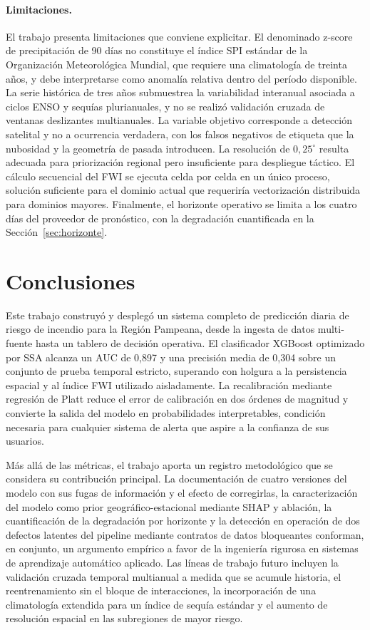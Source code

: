 \documentclass[11pt,a4paper]{article}
\begin{document}
\paragraph{Limitaciones.}
El trabajo presenta limitaciones que conviene explicitar. El denominado
z-score de precipitación de 90 días no constituye el índice SPI estándar de
la Organización Meteorológica Mundial, que requiere una climatología de
treinta años, y debe interpretarse como anomalía relativa dentro del
período disponible. La serie histórica de tres años submuestrea la
variabilidad interanual asociada a ciclos ENSO y sequías plurianuales, y no
se realizó validación cruzada de ventanas deslizantes multianuales. La
variable objetivo corresponde a detección satelital y no a ocurrencia
verdadera, con los falsos negativos de etiqueta que la nubosidad y la
geometría de pasada introducen. La resolución de $0{,}25^{\circ}$ resulta
adecuada para priorización regional pero insuficiente para despliegue
táctico. El cálculo secuencial del FWI se ejecuta celda por celda en un
único proceso, solución suficiente para el dominio actual que requeriría
vectorización distribuida para dominios mayores. Finalmente, el horizonte
operativo se limita a los cuatro días del proveedor de pronóstico, con la
degradación cuantificada en la Sección~\ref{sec:horizonte}.

\section{Conclusiones}
\label{sec:conclusiones}

Este trabajo construyó y desplegó un sistema completo de predicción diaria
de riesgo de incendio para la Región Pampeana, desde la ingesta de datos
multi-fuente hasta un tablero de decisión operativa. El clasificador
XGBoost optimizado por SSA alcanza un AUC de 0,897 y una precisión media de
0,304 sobre un conjunto de prueba temporal estricto, superando con holgura
a la persistencia espacial y al índice FWI utilizado aisladamente. La
recalibración mediante regresión de Platt reduce el error de calibración en
dos órdenes de magnitud y convierte la salida del modelo en probabilidades
interpretables, condición necesaria para cualquier sistema de alerta que
aspire a la confianza de sus usuarios.

Más allá de las métricas, el trabajo aporta un registro metodológico que se
considera su contribución principal. La documentación de cuatro versiones
del modelo con sus fugas de información y el efecto de corregirlas, la
caracterización del modelo como prior geográfico-estacional mediante SHAP y
ablación, la cuantificación de la degradación por horizonte y la detección
en operación de dos defectos latentes del pipeline mediante contratos de
datos bloqueantes conforman, en conjunto, un argumento empírico a favor de
la ingeniería rigurosa en sistemas de aprendizaje automático aplicado. Las
líneas de trabajo futuro incluyen la validación cruzada temporal multianual
a medida que se acumule historia, el reentrenamiento sin el bloque de
interacciones, la incorporación de una climatología extendida para un
índice de sequía estándar y el aumento de resolución espacial en las
subregiones de mayor riesgo.
\end{document}
